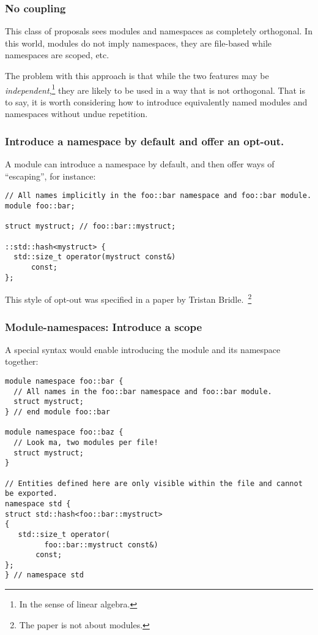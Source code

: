 \documentclass[reqno]{article}
\begin{document}
\subsubsection{No coupling}

This class of proposals sees modules and namespaces as completely orthogonal.
In this world, modules do not imply namespaces, they are file-based while
namespaces are scoped, etc.

The problem with this approach is that while the two features may be
\emph{independent},\footnote{In the sense of linear algebra.} they are likely
to be used in a way that is not orthogonal. That is to say, it is worth
considering how to introduce equivalently named modules and namespaces without
undue repetition.

\subsubsection{Introduce a namespace by default and offer an opt-out.}

A module can introduce a namespace by default, and then offer ways of
``escaping'', for instance:

\begin{verbatim}
// All names implicitly in the foo::bar namespace and foo::bar module.
module foo::bar;

struct mystruct; // foo::bar::mystruct;

::std::hash<mystruct> {
  std::size_t operator(mystruct const&)
      const;
};
\end{verbatim}

This style of opt-out was specified in a paper by Tristan
Bridle.~\citep{P0665R0}\footnote{The paper is not about modules.}


\subsubsection{Module-namespaces: Introduce a scope}

A special syntax would enable introducing the module and its namespace together:

\begin{verbatim}
module namespace foo::bar {
  // All names in the foo::bar namespace and foo::bar module.
  struct mystruct;
} // end module foo::bar

module namespace foo::baz {
  // Look ma, two modules per file!
  struct mystruct;
}

// Entities defined here are only visible within the file and cannot be exported.
namespace std {
struct std::hash<foo::bar::mystruct>
{
   std::size_t operator(
         foo::bar::mystruct const&)
       const;
};
} // namespace std
\end{verbatim}
\end{document}

